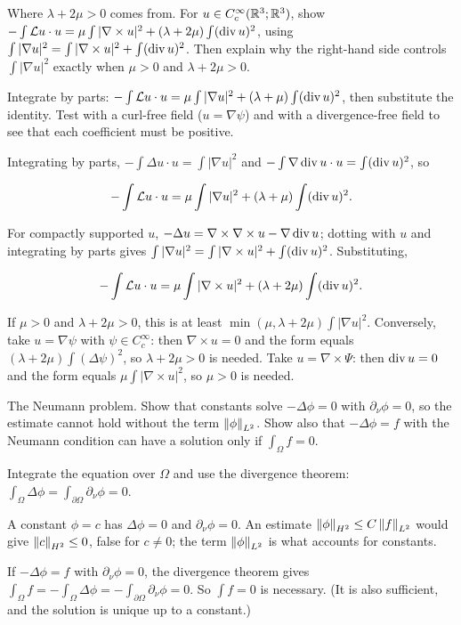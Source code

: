 \begin{exercise}
  Where $\lambda + 2\mu > 0$ comes from. For $u \in C_c^\infty(\mathbb{R}^3;\mathbb{R}^3)$, show $-\int \mathcal{L} u\cdot u = \mu\int|\nabla\times u|^2 + (\lambda + 2\mu)\int(\operatorname{div} u)^2$, using $\int|\nabla u|^2 = \int|\nabla\times u|^2 + \int(\operatorname{div} u)^2$. Then explain why the right-hand side controls $\int|\nabla u|^2$ exactly when $\mu > 0$ and $\lambda + 2\mu > 0$.
  \begin{hint}
    Integrate by parts: $-\int \mathcal{L} u\cdot u = \mu\int|\nabla u|^2 + (\lambda+\mu)\int(\operatorname{div} u)^2$, then substitute the identity. Test with a curl-free field ($u = \nabla\psi$) and with a divergence-free field to see that each coefficient must be positive.
  \end{hint}
  \begin{solution}
    Integrating by parts, $-\int\Delta u\cdot u = \int|\nabla u|^2$ and $-\int\nabla\operatorname{div} u\cdot u = \int(\operatorname{div} u)^2$, so

    \[ -\int\mathcal{L} u\cdot u = \mu\int|\nabla u|^2 + (\lambda+\mu)\int(\operatorname{div} u)^2. \]

    For compactly supported $u$, $-\Delta u = \nabla\times\nabla\times u - \nabla\operatorname{div} u$; dotting with $u$ and integrating by parts gives $\int|\nabla u|^2 = \int|\nabla\times u|^2 + \int(\operatorname{div} u)^2$. Substituting,

    \[ -\int\mathcal{L} u\cdot u = \mu\int|\nabla\times u|^2 + (\lambda+2\mu)\int(\operatorname{div} u)^2. \]

    If $\mu > 0$ and $\lambda + 2\mu > 0$, this is at least $\min(\mu,\lambda+2\mu)\int|\nabla u|^2$. Conversely, take $u = \nabla\psi$ with $\psi \in C_c^\infty$: then $\nabla\times u = 0$ and the form equals $(\lambda+2\mu)\int(\Delta\psi)^2$, so $\lambda + 2\mu > 0$ is needed. Take $u = \nabla\times\Psi$: then $\operatorname{div} u = 0$ and the form equals $\mu\int|\nabla\times u|^2$, so $\mu > 0$ is needed.
  \end{solution}
\end{exercise}

\begin{exercise}
  The Neumann problem. Show that constants solve $-\Delta\phi = 0$ with $\partial_\nu\phi = 0$, so the estimate cannot hold without the term $\left\lVert \phi\right\rVert_{L^2}$. Show also that $-\Delta\phi = f$ with the Neumann condition can have a solution only if $\int_\Omega f = 0$.
  \begin{hint}
    Integrate the equation over $\Omega$ and use the divergence theorem: $\int_\Omega \Delta\phi = \int_{\partial\Omega}\partial_\nu\phi = 0$.
  \end{hint}
  \begin{solution}
    A constant $\phi = c$ has $\Delta\phi = 0$ and $\partial_\nu\phi = 0$. An estimate $\left\lVert \phi\right\rVert_{H^2} \le C\left\lVert f\right\rVert_{L^2}$ would give $\left\lVert c\right\rVert_{H^2} \le 0$, false for $c \ne 0$; the term $\left\lVert \phi\right\rVert_{L^2}$ is what accounts for constants.

    If $-\Delta\phi = f$ with $\partial_\nu\phi = 0$, the divergence theorem gives $\int_\Omega f = -\int_\Omega\Delta\phi = -\int_{\partial\Omega}\partial_\nu\phi = 0$. So $\int f = 0$ is necessary. (It is also sufficient, and the solution is unique up to a constant.)
  \end{solution}
\end{exercise}

